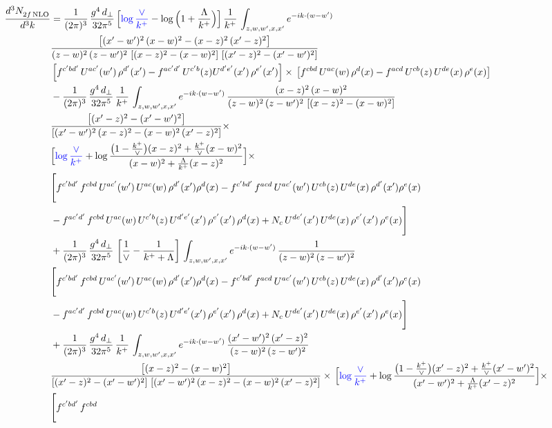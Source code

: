\documentclass[9pt]{article}
\numberwithin{equation}{section}
\begin{document}
\begin{align}
    \frac{d^{3}N_{2f\,\rm NLO}^{\rm}}{d^{3}k}  & = \frac{1}{(2\pi)^{3}}\, \frac{g^{4}\,d_{\perp}}{32\pi^{5}}\,\Big[{\color{blue}\log\frac{\vee}{k^{+}}}-\log\Big(1+\frac{\Lambda}{k^{+}}\Big)\Big]\,\frac{1}{k^{+}}\,\int_{z,w,w^{\prime},x,x'} e^{-ik\cdot (w-w')}\,\notag \\ & \frac{\left[(x'-w')^{2}\, (x-w)^{2} - (x-z)^{2}\, (x'-z)^{2}\right]}{(z-w)^{2}\, (z-w')^{2}\,\left[(x-z)^{2} - (x-w)^{2}\right]\, \left[(x'-z)^{2} - (x'-w')^{2}\right]}\notag \\ &   \left[f^{c'bd'}\, U^{ac'}(w')\,\rho^{d'}(x')-f^{ac'd'}\, U^{c'b}(z)U^{d'e'}(x')\, \rho^{e'}(x')\right]\times\, \left[f^{cbd}\, U^{ac}(w)\,\rho^{d}(x) - f^{acd}\, U^{cb}(z)\,U^{de}(x)\, \rho^{e}(x)\right] \notag \\ & - \frac{1}{(2\pi)^{3}}\, \frac{g^{4}\,d_{\perp}}{32\pi^{5}}\,\frac{1}{k^{+}}\,\int_{z,w,w^{\prime},x,x'} e^{-ik\cdot (w-w')}\,\frac{(x-z)^{2}\, (x-w)^{2}}{(z-w)^{2}\, (z-w')^{2}\,\left[(x-z)^{2} - (x-w)^{2}\right]}\,\notag \\ & \frac{\left[(x'-z)^{2}-(x'-w')^{2}\right]}{\left[(x'-w')^{2}\, (x-z)^{2} - (x-w)^{2}\, (x'-z)^{2}\right]}\times\notag \\ & \Big[{\color{blue}\log\frac{\vee}{k^{+}}}+\log\frac{\big(1-\frac{k^{+}}{\vee}\big)(x-z)^{2}+\frac{k^{+}}{\vee}(x-w)^{2}}{(x-w)^{2}+\frac{\Lambda}{k^{+}}(x-z)^{2}}\Big]\times\notag \\ & \Bigg[f^{c'bd'}\,f^{cbd}\, U^{ac'}(w')\,U^{ac}(w)\,\rho^{d'}(x')\rho^{d}(x)- f^{c'bd'}\,f^{acd}\,U^{ac'}(w')\,U^{cb}(z)\,U^{de}(x)\,\rho^{d'}(x')\rho^{e}(x) \notag \\ & -f^{ac'd'}\,f^{cbd}\,U^{ac}(w)\,U^{c'b}(z)\,U^{d'e'}(x')\,\rho^{e'}(x')\,\rho^{d}(x) +N_{c}\,U^{de'}(x')\,U^{de}(x)\,\rho^{e'}(x')\,\rho^{e}(x)\Bigg] \notag \\ & + \frac{1}{(2\pi)^{3}}\, \frac{g^{4}\,d_{\perp}}{32\pi^{5}}\,\left[\frac{1}{\vee} - \frac{1}{k^{+} + \Lambda}\right]\,\int_{z,w,w^{\prime},x,x'} e^{-ik\cdot (w-w')}\,\frac{1}{(z-w)^{2}\, (z-w')^{2}}\notag \\ & \Bigg[f^{c'bd'}\,f^{cbd}\, U^{ac'}(w')\,U^{ac}(w)\,\rho^{d'}(x')\rho^{d}(x)- f^{c'bd'}\,f^{acd}\,U^{ac'}(w')\,U^{cb}(z)\,U^{de}(x)\,\rho^{d'}(x')\rho^{e}(x) \notag \\ & -f^{ac'd'}\,f^{cbd}\,U^{ac}(w)\,U^{c'b}(z)\,U^{d'e'}(x')\,\rho^{e'}(x')\,\rho^{d}(x) +N_{c}\,U^{de'}(x')\,U^{de}(x)\,\rho^{e'}(x')\,\rho^{e}(x)\Bigg] \notag \\ & + \frac{1}{(2\pi)^{3}}\, \frac{g^{4}\,d_{\perp}}{32\pi^{5}}\,\frac{1}{k^{+}}\,\int_{z,w,w^{\prime},x,x'} e^{-ik\cdot (w-w')}\,\frac{(x'-w')^{2}\, (x'-z)^{2}}{(z-w)^{2}\, (z-w')^{2}}\notag \\ & \frac{\left[(x-z)^{2} - (x-w)^{2}\right]}{\left[(x'-z)^{2} - (x'-w')^{2}\right]\, \left[(x'-w')^{2}\, (x - z)^{2} - (x-w)^{2}\,(x'-z)^{2}\right]}\times\, \Big[{\color{blue}\log\frac{\vee}{k^{+}}}+\log\frac{\big(1-\frac{k^{+}}{\vee}\big)(x'-z)^{2}+\frac{k^{+}}{\vee}(x'-w')^{2}}{(x'-w')^{2}+\frac{\Lambda}{k^{+}}(x'-z)^{2}}\Big]\times \notag \\ &  \Bigg[f^{c'bd'}\,f^{cbd}\, 
\end{align}
\end{document}
